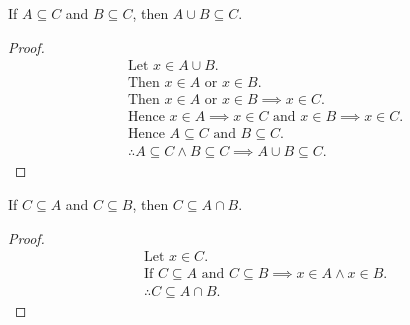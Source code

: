 \begin{question}
  If $ A \subseteq C$ and $B \subseteq C$, then $A \cup B \subseteq C$.
\end{question}
\begin{proof}
  \begin{align*}
    & \text{Let } x \in A \cup B. \\
    & \text{Then } x \in A \text{ or } x \in B. \\
    & \text{Then } x \in A \text{ or } x \in B \implies x \in C. \\
    & \text{Hence } x \in A \implies x \in C \text{ and } x \in B \implies x \in C. \\
    & \text{Hence } A \subseteq C \text{ and } B \subseteq C. \\
    & \therefore A \subseteq C \land B \subseteq C \implies A \cup B \subseteq C.
  \end{align*}
\end{proof}

\begin{question}
  If $C \subseteq A$ and $C \subseteq B$, then $C \subseteq A \cap B$.
\end{question}
\begin{proof}
  \begin{align*}
    & \text{Let } x \in C. \\
    & \text{If } C \subseteq A \text{ and } C \subseteq B \implies x \in A \land x \in B. \\ 
    & \therefore C \subseteq A \cap B.
  \end{align*}
\end{proof}


